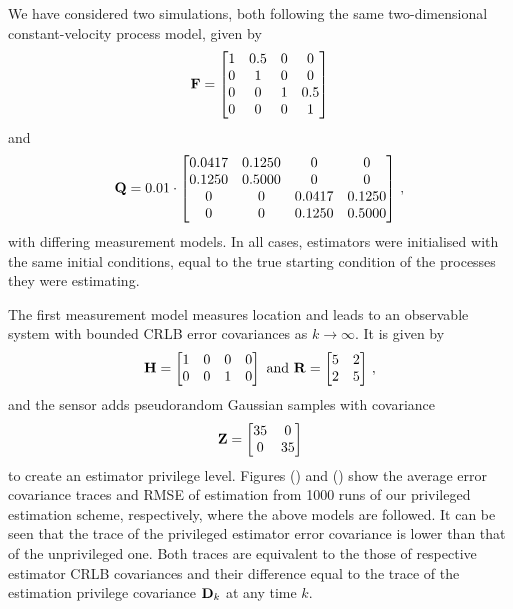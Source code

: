 \documentclass[letterpaper, 10 pt, conference]{IEEEtran}
\theoremstyle{definition}
\theoremstyle{definition}
\theoremstyle{remark}
\begin{document}
We have considered two simulations, both following the same two-dimensional constant-velocity process model, given by
\begin{equation*}
   {\ensuremath{{\mathbf{F}}}}=
   \begin{bmatrix}
      1 & 0.5 & 0 & 0\\
      0 & 1 & 0 & 0\\
      0 & 0 & 1 & 0.5\\
      0 & 0 & 0 & 1
   \end{bmatrix}
\end{equation*}
and
\begin{equation*}
   {\ensuremath{{\mathbf{Q}}}}=0.01\cdot
   \begin{bmatrix}
      0.0417 & 0.1250 & 0 & 0\\
      0.1250 & 0.5000 & 0 & 0\\
      0 & 0 & 0.0417 & 0.1250\\
      0 & 0 & 0.1250 & 0.5000
   \end{bmatrix}\,,
\end{equation*}
with differing measurement models. In all cases, estimators were initialised with the same initial conditions, equal to the true starting condition of the processes they were estimating.

The first measurement model measures location and leads to an observable system with bounded CRLB error covariances as $k \rightarrow \infty$. It is given by
\begin{equation*}
   {\ensuremath{{\mathbf{H}}}}=
   \begin{bmatrix}
      1 & 0 & 0 & 0\\
      0 & 0 & 1 & 0
   \end{bmatrix}
   \text{ and }
   {\ensuremath{{\mathbf{R}}}}=
   \begin{bmatrix}
      5 & 2\\
      2 & 5
   \end{bmatrix}\,,
\end{equation*}
and the sensor adds pseudorandom Gaussian samples with covariance
\begin{equation*}
   {\ensuremath{{\mathbf{Z}}}}=
   \begin{bmatrix}
      35 & 0\\
      0 & 35
   \end{bmatrix}
\end{equation*}
to create an estimator privilege level. Figures () and () show the average error covariance traces and RMSE of estimation from 1000 runs of our privileged estimation scheme, respectively, where the above models are followed. It can be seen that the trace of the privileged estimator error covariance is lower than that of the unprivileged one. Both traces are equivalent to the those of respective estimator CRLB covariances and their difference equal to the trace of the estimation privilege covariance ${{\mathbf{D}}}_k$ at any time $k$.
\end{document}
